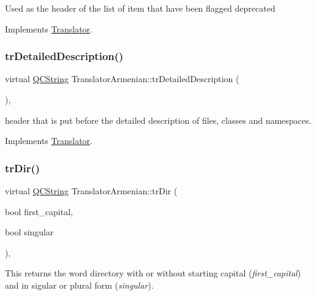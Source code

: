 Used as the header of the list of item that have been flagged deprecated 

Implements \mbox{\hyperlink{class_translator}{Translator}}.

\mbox{\label{class_translator_armenian_a43eb96810f267e1a8687fa50b411e4fc}} 
\subsubsection{\texorpdfstring{trDetailedDescription()}{trDetailedDescription()}}
{\footnotesize\ttfamily virtual \mbox{\hyperlink{class_q_c_string}{Q\+C\+String}} Translator\+Armenian\+::tr\+Detailed\+Description (\begin{DoxyParamCaption}{ }\end{DoxyParamCaption})\hspace{0.3cm}{\ttfamily [inline]}, {\ttfamily [virtual]}}

header that is put before the detailed description of files, classes and namespaces. 

Implements \mbox{\hyperlink{class_translator}{Translator}}.

\mbox{\label{class_translator_armenian_a4fb72393cdc0492b52e0ae6a55861b15}} 
\subsubsection{\texorpdfstring{trDir()}{trDir()}}
{\footnotesize\ttfamily virtual \mbox{\hyperlink{class_q_c_string}{Q\+C\+String}} Translator\+Armenian\+::tr\+Dir (\begin{DoxyParamCaption}\item[{bool}]{first\+\_\+capital,  }\item[{bool}]{singular }\end{DoxyParamCaption})\hspace{0.3cm}{\ttfamily [inline]}, {\ttfamily [virtual]}}

This returns the word directory with or without starting capital ({\itshape first\+\_\+capital}) and in sigular or plural form ({\itshape singular}). 

